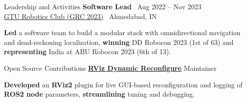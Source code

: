 \documentclass{resume}
\begin{document}
\begin{rSection}{Leadership and Activities}
{\bf Software Lead}  \hfill {\ Aug 2022 -- Nov 2023}\\
{\href{https://www.gturoboticsclub.com/acheivements}{GTU Robotics Club (GRC 2023)}} \hfill {\ {Ahmedabad, IN}}
\begin{cvitems}
  \item \textbf{Led} a software team to build a modular stack with omnidirectional navigation and dead-reckoning localization, \textbf{winning} DD Robocon 2023 (1st of 63) and \textbf{representing} India at ABU Robocon 2023 (6th of 13).
\end{cvitems}
\end{rSection}

\begin{rSection}{Open Source Contributions}
    {\href{https://github.com/shahjesal15/dynamic_reconfigure}{\bf RViz Dynamic Reconfigure}} \hfill {Maintainer}
\begin{cvitems}
    \item \textbf{Developed} an \textbf{RViz2} plugin for live GUI-based reconfiguration and logging of \textbf{ROS2 node} parameters, \textbf{streamlining} tuning and debugging.
\end{cvitems}
\end{rSection}
\end{document}
